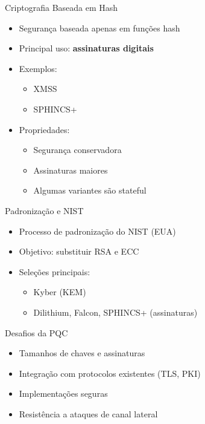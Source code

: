 \documentclass[aspectratio=169]{beamer}
\begin{document}
	\begin{frame}{Criptografia Baseada em Hash}
		\begin{itemize}
			\item Segurança baseada apenas em funções hash
			\item Principal uso: \textbf{assinaturas digitais}
			\item Exemplos:
			\begin{itemize}
				\item XMSS
				\item SPHINCS+
			\end{itemize}
			\item Propriedades:
			\begin{itemize}
				\item Segurança conservadora
				\item Assinaturas maiores
				\item Algumas variantes são stateful
			\end{itemize}
		\end{itemize}
	\end{frame}
	
	\begin{frame}{Padronização e NIST}
		\begin{itemize}
			\item Processo de padronização do NIST (EUA)
			\item Objetivo: substituir RSA e ECC
			\item Seleções principais:
			\begin{itemize}
				\item Kyber (KEM)
				\item Dilithium, Falcon, SPHINCS+ (assinaturas)
			\end{itemize}
		\end{itemize}
	\end{frame}
	
	\begin{frame}{Desafios da PQC}
		\begin{itemize}
			\item Tamanhos de chaves e assinaturas
			\item Integração com protocolos existentes (TLS, PKI)
			\item Implementações seguras
			\item Resistência a ataques de canal lateral
		\end{itemize}
	\end{frame}
	
\end{document}
